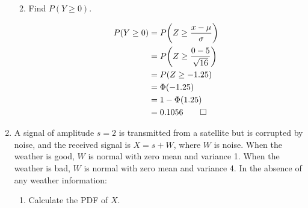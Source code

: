 \documentclass[paper=usletter, fontsize=12pt]{article}
\begin{document}
\begin{enumerate}
\begin{enumerate}
\begin{cproof}
            \end{cproof}

            \item Find $P(Y\ge 0)$.
            \begin{cproof}

                \begin{align*}
                    P(Y\ge 0) & = P\bigg(Z\ge \frac{x-\mu}{\sigma} \bigg)\\
                    & = P\bigg(Z\ge \frac{0-5}{\sqrt{16}} \bigg)\\
                    & = P(Z\ge -1.25)\\
                    & = \Phi(-1.25)\\
                    & = 1-\Phi(1.25)\\
                    & = 0.1056 \qedhere
                \end{align*}
                \endgroup

            \end{cproof}

        \end{enumerate}

        \item A signal of amplitude $s = 2$ is transmitted from a satellite but
        is corrupted by noise, and the received signal is $X = s+W$, where $W$
        is noise. When the weather is good, $W$ is normal with zero mean and
        variance 1. When the weather is bad, $W$ is normal with zero mean and
        variance 4. In the absence of any weather information:
        \begin{enumerate}

            \item Calculate the PDF of $X$.
            \begin{cproof}


\end{cproof}
\end{enumerate}
\end{enumerate}
\end{document}
